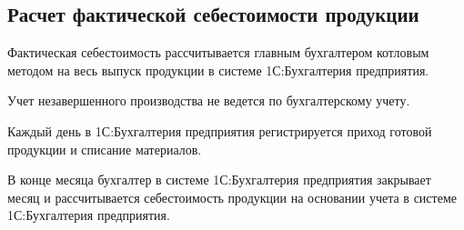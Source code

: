 \subsection{Расчет фактической себестоимости продукции}
Фактическая себестоимость рассчитывается главным бухгалтером котловым методом на весь выпуск продукции в системе 1С:Бухгалтерия предприятия. 

Учет незавершенного производства не ведется по бухгалтерскому учету.

Каждый день в 1С:Бухгалтерия предприятия регистрируется приход готовой продукции и списание материалов. 

В конце месяца бухгалтер в системе 1С:Бухгалтерия предприятия закрывает месяц и рассчитывается себестоимость продукции на основании учета в системе 1С:Бухгалтерия предприятия.
